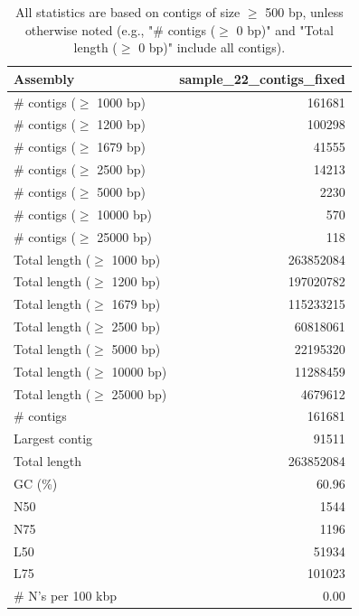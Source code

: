 \documentclass[12pt,a4paper]{article}
\begin{document}
\begin{table}[ht]
\begin{center}
\caption{All statistics are based on contigs of size $\geq$ 500 bp, unless otherwise noted (e.g., "\# contigs ($\geq$ 0 bp)" and "Total length ($\geq$ 0 bp)" include all contigs).}
\begin{tabular}{|l*{1}{|r}|}
\hline
Assembly & sample\_22\_contigs\_fixed \\ \hline
\# contigs ($\geq$ 1000 bp) & 161681 \\ \hline
\# contigs ($\geq$ 1200 bp) & 100298 \\ \hline
\# contigs ($\geq$ 1679 bp) & 41555 \\ \hline
\# contigs ($\geq$ 2500 bp) & 14213 \\ \hline
\# contigs ($\geq$ 5000 bp) & 2230 \\ \hline
\# contigs ($\geq$ 10000 bp) & 570 \\ \hline
\# contigs ($\geq$ 25000 bp) & 118 \\ \hline
Total length ($\geq$ 1000 bp) & 263852084 \\ \hline
Total length ($\geq$ 1200 bp) & 197020782 \\ \hline
Total length ($\geq$ 1679 bp) & 115233215 \\ \hline
Total length ($\geq$ 2500 bp) & 60818061 \\ \hline
Total length ($\geq$ 5000 bp) & 22195320 \\ \hline
Total length ($\geq$ 10000 bp) & 11288459 \\ \hline
Total length ($\geq$ 25000 bp) & 4679612 \\ \hline
\# contigs & 161681 \\ \hline
Largest contig & 91511 \\ \hline
Total length & 263852084 \\ \hline
GC (\%) & 60.96 \\ \hline
N50 & 1544 \\ \hline
N75 & 1196 \\ \hline
L50 & 51934 \\ \hline
L75 & 101023 \\ \hline
\# N's per 100 kbp & 0.00 \\ \hline
\end{tabular}
\end{center}
\end{table}
\end{document}
